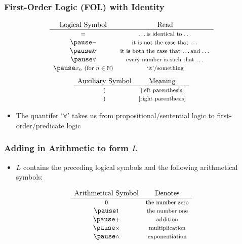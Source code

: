 \begin{frame}
\frametitle{First-Order Logic (FOL) with Identity}



\[
\begin{array}{cc}\label{gloss:logica-symb}
 \text{{Logical Symbol}}  &\text{{Read}}   \\
\hline
  \text{\footnotesize $=$}  & \text{\footnotesize  \dots is identical to \dots}  \\ \pause
 \text{\footnotesize $\neg$} & \text{\footnotesize  it is not the case that \dots}  \\ \pause
\text{\footnotesize $\&$}  & \text{\footnotesize  it is both the case that \dots and \dots}  \\ \pause
\text{\footnotesize $\forall$} & \text{\footnotesize  every number is such that \dots} \\ \pause
\text{\footnotesize $x_n$ (for $n \in \mathbb{N}$)} & \text{\footnotesize `it'/something} 
\end{array}
\]
\pause
\[
\begin{array}{cc}
 \text{{Auxiliary Symbol}} & \text{{Meaning}}  \\
\hline
 \text{\footnotesize $($} &\text{\footnotesize [left parenthesis]}\\   
  \text{\footnotesize $)$} &\text{\footnotesize [right parenthesis]}
\end{array}
\]
\pause
\begin{itemize}[<+->]

\item The quantifer `$\forall$' takes us from propositional/sentential logic to first-order/predicate logic 
\end{itemize}


\end{frame}

\begin{frame}
\frametitle{Adding in Arithmetic to form $L$}

\begin{itemize}[<+->]

\item $L$ contains the preceding logical symbols and the following arithmetical symbols:
\end{itemize}
\[
\begin{array}{cc}\label{gloss:exponentiation}
 \text{{Arithmetical Symbol}} &\text{{Denotes}}   \\
\hline
 \text{\footnotesize 0}   & \text{\footnotesize  the number zero}  \\ \pause 
  \text{\footnotesize 1}  & \text{\footnotesize  the number one}  \\ \pause 
    \text{\footnotesize $+$}  & \text{\footnotesize  addition}  \\ \pause 
        \text{\footnotesize $\times$}  & \text{\footnotesize  multiplication}  \\ \pause 
            \text{\footnotesize $\wedge$}  & \text{\footnotesize  exponentiation} 
\end{array}
\]



\end{frame}

